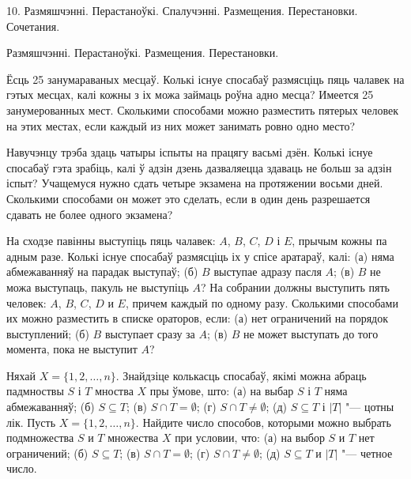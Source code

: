 



\biLangHeader
{10. Размяшчэнні. Перастаноўкі. Спалучэнні.}
{Размещения. Перестановки. Сочетания.}

\biLangHeader
{Размяшчэнні. Перастаноўкі.}
{Размещения. Перестановки.}

\begin{problemList}

\problemItemSimple
{Ёсць 25 занумараваных месцаў. Колькі існуе спосабаў размясціць пяць чалавек на гэтых месцах,
калі кожны з іх можа займаць роўна адно месца?}
{Имеется 25 занумерованных мест. Сколькими способами можно разместить
пятерых человек на этих местах, если каждый из них может занимать
ровно одно место?}

\bigskip

\problemItemSimple
{Навучэнцу трэба здаць чатыры іспыты на працягу васьмі дзён. Колькі існуе спосабаў гэта зрабіць,
калі ў адзін дзень дазваляецца здаваць не больш за адзін іспыт?}
{Учащемуся нужно сдать четыре экзамена на протяжении восьми дней.
Сколькими способами он может это сделать, если в один день разрешается
сдавать не более одного экзамена?}

\bigskip

\problemItemSimple
{На сходзе павінны выступіць пяць чалавек: $A$, $B$, $C$, $D$ і $E$,
прычым кожны па адным разе. Колькі існуе спосабаў размясціць іх у спісе аратараў,
калі: (а) няма абмежаванняў на парадак выступаў; (б) $B$ выступае адразу пасля $A$;
(в) $B$ не можа выступаць, пакуль не выступіць $A$?}
{На собрании должны выступить пять человек: $A$, $B$, $C$, $D$ и $E$,
причем каждый по одному разу. Сколькими способами их можно разместить
в списке ораторов, если: (а) нет ограничений на порядок выступлений;
(б) $B$ выступает сразу за $A$; (в) $B$ не может выступать до того
момента, пока не выступит $A$?}

\bigskip

\problemItemSimple
{Няхай $X = \{1, 2, \ldots, n\}$. Знайдзіце колькасць спосабаў, якімі можна абраць
падмноствы $S$ і $T$ мноства $X$ пры ўмове, што:
(а) на выбар $S$ і $T$ няма абмежаванняў; (б) $S \subseteq T$; (в)
$S \cap T = \emptyset$; (г) $S \cap T \ne \emptyset$; (д)
$S \subseteq T$ і $|T|$ "--- цотны лік.}
{Пусть $X = \{1, 2, \ldots, n\}$. Найдите число способов, которыми
можно выбрать подмножества $S$ и $T$ множества $X$ при условии, что:
(а) на выбор $S$ и $T$ нет ограничений; (б) $S \subseteq T$; (в)
$S \cap T = \emptyset$; (г) $S \cap T \ne \emptyset$; (д)
$S \subseteq T$ и $|T|$ "--- четное число.}


\end{problemList}
